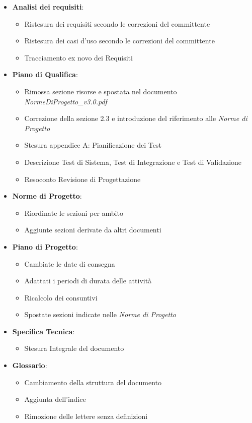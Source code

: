 \begin{itemize}
	\item \textbf{Analisi dei requisiti}:
	\begin{itemize}
		\item Ristesura dei requisiti secondo le correzioni del committente
		\item Ristesura dei casi d'uso secondo le correzioni del committente
		\item Tracciamento ex novo dei Requisiti
	\end{itemize}
	\item \textbf{Piano di Qualifica}:
	\begin{itemize}
		\item Rimossa sezione risorse e spostata nel documento \textit{NormeDiProgetto\_v3.0.pdf}
		\item Correzione della sezione 2.3 e introduzione del riferimento alle \textit{Norme di Progetto}
		\item Stesura appendice A: Pianificazione dei Test
		\item Descrizione Test di Sistema, Test di Integrazione e Test di Validazione
		\item Resoconto Revisione di Progettazione
	\end{itemize}
	\item \textbf{Norme di Progetto}:
	\begin{itemize}
		\item Riordinate le sezioni per ambito
		\item Aggiunte sezioni derivate da altri documenti
	\end{itemize}
	\item \textbf{Piano di Progetto}:
	\begin{itemize}
		\item Cambiate le date di consegna
		\item Adattati i periodi di durata delle attività
		\item Ricalcolo dei consuntivi
		\item Spostate sezioni indicate nelle \textit{Norme di Progetto}
	\end{itemize}	
	\item \textbf{Specifica Tecnica}:
	\begin{itemize}
		\item Stesura Integrale del documento
	\end{itemize}	
	\item \textbf{Glossario}:
	\begin{itemize}
		\item Cambiamento della struttura del documento
		\item Aggiunta dell'indice
		\item Rimozione delle lettere senza definizioni
	\end{itemize}
\end{itemize}
\newpage
